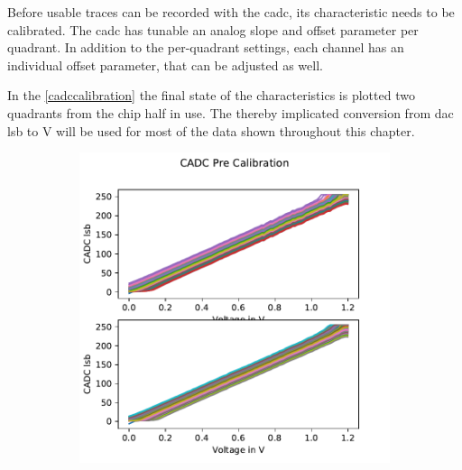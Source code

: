 Before usable traces can be recorded with the \gls{cadc}, its characteristic needs to be calibrated. The \gls{cadc} has tunable an analog slope and offset parameter per quadrant. In addition to the per-quadrant settings, each channel has an individual offset parameter, that can be adjusted as well.

In the \cref{cadccalibration} the final state of the characteristics is plotted two quadrants from the chip half in use. The thereby implicated conversion from \gls{dac} lsb to \si{\V} will be used for most of the data shown throughout this chapter.
\begin{figure}
	\begin{subfigure}{0.5\textwidth}
		\caption{}
		\includegraphics[width=\textwidth]{figures/temporary/cadc_pre_calib_hx70.pdf}
		\label{precadccalib}
	\end{subfigure}
	\begin{subfigure}{0.5\textwidth}
		\caption{}

\end{subfigure}
\end{figure}

